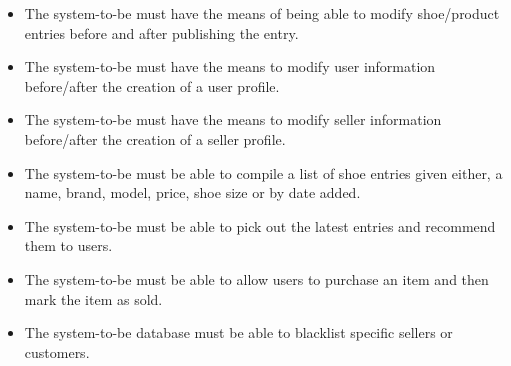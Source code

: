 \begin{itemize}
  \item The system-to-be must have the means of being able to modify shoe/product entries before and after publishing the entry.
  \item The system-to-be must have the means to modify user information before/after the creation of a user profile.
  \item The system-to-be must have the means to modify seller information before/after the creation of a seller profile.
  \item The system-to-be must be able to compile a list of shoe entries given either, a name, brand, model, price, shoe size or by date added.
  \item The system-to-be must be able to pick out the latest entries and recommend them to users.
  \item The system-to-be must be able to allow users to purchase an item and then mark the item as sold.
  \item The system-to-be database must be able to blacklist specific sellers or customers.
\end{itemize}
